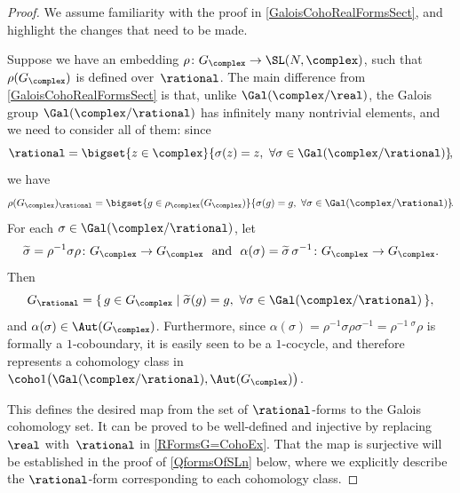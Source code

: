 \begin{proof}
We assume familiarity with the proof in \cref{GaloisCohoRealFormsSect}, and highlight the changes that need to be made.

Suppose we have an embedding $\rho \colon G_\complex \to \SL(N,\complex)$, such that $\rho(G_\complex)$ is defined over~$\rational$. 
%
%
The main difference from \cref{GaloisCohoRealFormsSect} is that, unlike $\Gal(\complex/\real)$, the Galois group $\Gal(\complex/\rational)$ has infinitely many nontrivial elements, and we need to consider all of them: since
	$$ \rational = \bigset{ z \in \complex }{ \sigma(z) = z, \ \forall \sigma \in \Gal(\complex/\rational) } \! , $$
we have
	$$ \rho(G_\complex)_\rational 
	= \bigset{ g \in \rho_\complex(G_\complex) }{ \sigma(g) = g, \ \forall \sigma \in \Gal(\complex/\rational) } \! .$$
For each $\sigma \in \Gal(\complex/\rational)$, let 
	$$ \text{$\widetilde\sigma = \rho^{-1} \sigma \rho \colon G_{\complex} \to G_{\complex}$
\ and \ $ \alpha(\sigma) = \widetilde\sigma \, \sigma^{-1} \colon G_{\complex} \to G_{\complex}$} .$$
Then 
	$$ G_{\rational} = \{\, g \in G_{\complex} \mid \widetilde\sigma(g) = g, \ \forall\sigma \in \Gal(\complex/\rational) \,\} ,$$
and $\alpha(\sigma) \in \Aut(G_{\complex})$. 
Furthermore, since 
	$\alpha(\sigma) = \rho^{-1} \sigma \rho \sigma^{-1} = \rho^{-1} \, {}^\sigma \! \!\rho$
is formally a $1$-coboundary,  
it is easily seen to be a $1$-cocycle, and therefore represents a cohomology class in $\coho1\bigl( \Gal(\complex/\rational), \Aut(G_{\complex}) \bigr)$. 

This defines the desired map from the set of $\rational$-forms to the Galois cohomology set. It can be proved to be well-defined and injective by replacing $\real$ with~$\rational$ in \cref{RFormsG=CohoEx}. That the map is surjective will be established in the proof of \cref{QformsOfSLn} below, %
where we explicitly describe the $\rational$-form corresponding to each cohomology class.
\end{proof}

